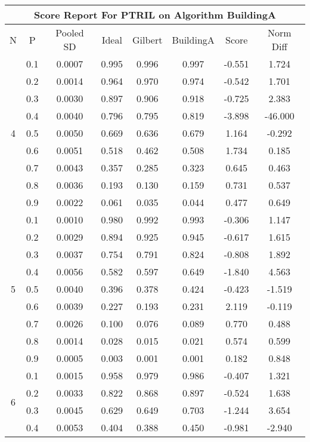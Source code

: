 \documentclass[11pt,a4paper]{report}
\begin{document}
\begin{longtable}{ | c | c || c | c | c | c | c | c | }
\hline
\multicolumn{8}{|c|}{ Score Report For PTRIL on Algorithm BuildingA} \\
\hline
N & P & Pooled SD &  Ideal &  Gilbert & BuildingA  & Score & Norm Diff \\
 \hline
 \hline
 \endhead
\multirow{9}{*}{4} & 0.1 & 0.0007 & 0.995 & 0.996 & 0.997 & -0.551 & 1.724 \\
 & 0.2 & 0.0014 & 0.964 & 0.970 & 0.974 & -0.542 & 1.701 \\
 & 0.3 & 0.0030 & 0.897 & 0.906 & 0.918 & -0.725 & 2.383 \\
 & 0.4 & 0.0040 & 0.796 & 0.795 & 0.819 & -3.898 & -46.000 \\
 & 0.5 & 0.0050 & 0.669 & 0.636 & 0.679 & 1.164 & -0.292 \\
 & 0.6 & 0.0051 & 0.518 & 0.462 & 0.508 & 1.734 & 0.185 \\
 & 0.7 & 0.0043 & 0.357 & 0.285 & 0.323 & 0.645 & 0.463 \\
 & 0.8 & 0.0036 & 0.193 & 0.130 & 0.159 & 0.731 & 0.537 \\
 & 0.9 & 0.0022 & 0.061 & 0.035 & 0.044 & 0.477 & 0.649 \\
 \hline
\multirow{9}{*}{5} & 0.1 & 0.0010 & 0.980 & 0.992 & 0.993 & -0.306 & 1.147 \\
 & 0.2 & 0.0029 & 0.894 & 0.925 & 0.945 & -0.617 & 1.615 \\
 & 0.3 & 0.0037 & 0.754 & 0.791 & 0.824 & -0.808 & 1.892 \\
 & 0.4 & 0.0056 & 0.582 & 0.597 & 0.649 & -1.840 & 4.563 \\
 & 0.5 & 0.0040 & 0.396 & 0.378 & 0.424 & -0.423 & -1.519 \\
 & 0.6 & 0.0039 & 0.227 & 0.193 & 0.231 & 2.119 & -0.119 \\
 & 0.7 & 0.0026 & 0.100 & 0.076 & 0.089 & 0.770 & 0.488 \\
 & 0.8 & 0.0014 & 0.028 & 0.015 & 0.021 & 0.574 & 0.599 \\
 & 0.9 & 0.0005 & 0.003 & 0.001 & 0.001 & 0.182 & 0.848 \\
 \hline
\multirow{9}{*}{6} & 0.1 & 0.0015 & 0.958 & 0.979 & 0.986 & -0.407 & 1.321 \\
 & 0.2 & 0.0033 & 0.822 & 0.868 & 0.897 & -0.524 & 1.638 \\
 & 0.3 & 0.0045 & 0.629 & 0.649 & 0.703 & -1.244 & 3.654 \\
 & 0.4 & 0.0053 & 0.404 & 0.388 & 0.450 & -0.981 & -2.940 \\

\end{longtable}
\end{document}
